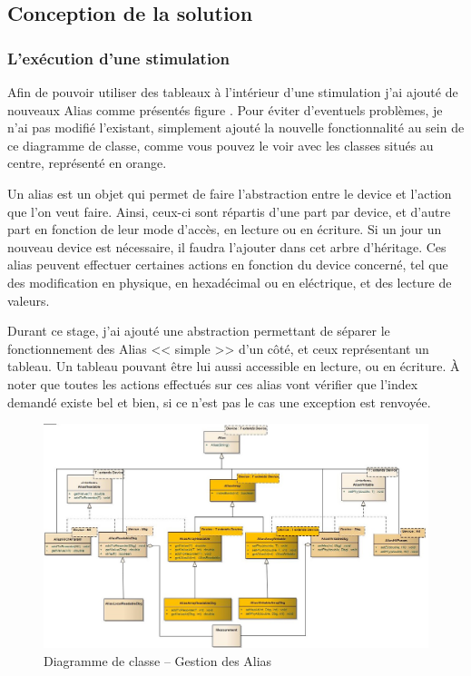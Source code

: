 \subsection{Conception de la solution}
\subsubsection{L'exécution d'une stimulation}
Afin de pouvoir utiliser des tableaux à l'intérieur d'une stimulation j'ai ajouté de nouveaux Alias comme présentés figure \label{fig:alias}. Pour éviter d'eventuels problèmes, je n'ai pas modifié l'existant, simplement ajouté la nouvelle fonctionnalité au sein de ce diagramme de classe, comme vous pouvez le voir avec les classes situés au centre, représenté en orange.

Un alias est un objet qui permet de faire l'abstraction entre le device et l'action que l'on veut faire. Ainsi, ceux-ci sont répartis d'une part par device, et d'autre part en fonction de leur mode d'accès, en lecture ou en écriture. Si un jour un nouveau device est nécessaire, il faudra l'ajouter dans cet arbre d'héritage. Ces alias peuvent effectuer certaines actions en fonction du device concerné, tel que des modification en physique, en hexadécimal ou en eléctrique, et des lecture de valeurs.

Durant ce stage, j'ai ajouté une abstraction permettant de séparer le fonctionnement des Alias << simple >> d'un côté, et ceux représentant un tableau. Un tableau pouvant être lui aussi accessible en lecture, ou en écriture. À noter que toutes les actions effectués sur ces alias vont vérifier que l'index demandé existe bel et bien, si ce n'est pas le cas une exception est renvoyée. 
\begin{figure}[H]
\hspace{-35px}
\includegraphics[width=20.5cm]{contents/images/alias.jpg}
\caption{Diagramme de classe -- Gestion des Alias}
\label{fig:alias}
\end{figure}

